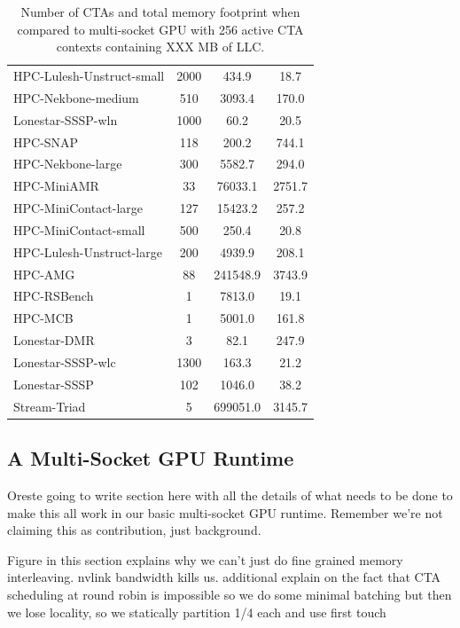 \begin{table}[t]
\begin{small}
\begin{tabular}{lccc}
HPC-Lulesh-Unstruct-small & 2000 & 434.9 & 18.7 \\
HPC-Nekbone-medium & 510 & 3093.4 & 170.0 \\
Lonestar-SSSP-wln & 1000 & 60.2 & 20.5 \\
HPC-SNAP & 118 & 200.2 & 744.1 \\
HPC-Nekbone-large & 300 & 5582.7 & 294.0 \\
HPC-MiniAMR & 33 & 76033.1 & 2751.7 \\
HPC-MiniContact-large & 127 & 15423.2 & 257.2 \\
HPC-MiniContact-small & 500 & 250.4 & 20.8 \\
HPC-Lulesh-Unstruct-large & 200 & 4939.9 & 208.1 \\
HPC-AMG & 88 & 241548.9 & 3743.9 \\
HPC-RSBench & 1 & 7813.0 & 19.1 \\
HPC-MCB & 1 & 5001.0 & 161.8 \\
Lonestar-DMR & 3 & 82.1 & 247.9 \\
Lonestar-SSSP-wlc & 1300 & 163.3 & 21.2 \\
Lonestar-SSSP & 102 & 1046.0 & 38.2 \\
Stream-Triad & 5 & 699051.0 & 3145.7 \\
\toprule
\end{tabular}
\caption{Number of CTAs and total memory footprint when compared to multi-socket GPU with 256 active CTA contexts containing XXX MB of LLC.}
\label{tab:numctas}
\end{small}
\end{table}



\subsection{A Multi-Socket GPU Runtime}

Oreste going to write section here with all the details of what needs to be done
to make this all work in our basic multi-socket GPU runtime.  Remember we're not
claiming this as contribution, just background.

Figure in this section explains why we can't just do fine grained memory interleaving.
nvlink bandwidth kills us.  additional explain on the fact that CTA scheduling at round robin
is impossible so we do some minimal batching but then we lose locality, so we statically
partition 1/4 each and use first touch


